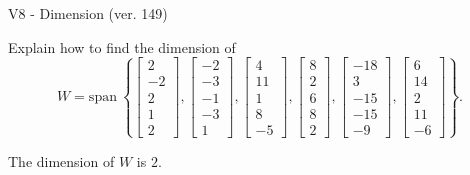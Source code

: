 \begin{exercise}
  \begin{exerciseTitle}V8 - Dimension (ver. 149)\end{exerciseTitle}
  \begin{exerciseStatement}
    Explain how to find the dimension of 
\[W=\mathrm{span}\ \left\{\left[\begin{array}{r}
2 \\
-2 \\
2 \\
1 \\
2
\end{array}\right] , \left[\begin{array}{r}
-2 \\
-3 \\
-1 \\
-3 \\
1
\end{array}\right] , \left[\begin{array}{r}
4 \\
11 \\
1 \\
8 \\
-5
\end{array}\right] , \left[\begin{array}{r}
8 \\
2 \\
6 \\
8 \\
2
\end{array}\right] , \left[\begin{array}{r}
-18 \\
3 \\
-15 \\
-15 \\
-9
\end{array}\right] , \left[\begin{array}{r}
6 \\
14 \\
2 \\
11 \\
-6
\end{array}\right]\right\}.\]



  \end{exerciseStatement}
  \begin{exerciseAnswer}
   The dimension of \(W\) is  \(2\).
  


  \end{exerciseAnswer}
\end{exercise}